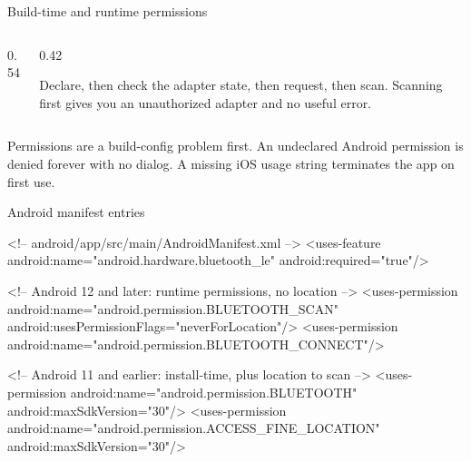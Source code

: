 \documentclass[10pt,aspectratio=169,t]{beamer}
\begin{document}
\begin{frame}[eyebrow=Permissions]{Build-time and runtime permissions}
  \vskip 2mm
  \begin{columns}[T]
    \begin{column}{0.54\textwidth}
      \vskip 2mm
    \end{column}
    \begin{column}{0.42\textwidth}
      \begin{hint}
        Declare, then check the adapter state, then request, then scan. Scanning first gives you an unauthorized adapter and no useful error.
      \end{hint}
    \end{column}
  \end{columns}
  \begin{takeaway}{Permissions are a build-config problem first.}
    An undeclared Android permission is denied forever with no dialog. A missing iOS usage string terminates the app on first use.
  \end{takeaway}
\end{frame}

\begin{frame}[fragile,eyebrow=Permissions]{Android manifest entries}
\begin{codeblock}
<!-- android/app/src/main/AndroidManifest.xml -->
<uses-feature android:name="android.hardware.bluetooth_le"
              android:required="true"/>

<!-- Android 12 and later: runtime permissions, no location -->
<uses-permission android:name="android.permission.BLUETOOTH_SCAN"
                 android:usesPermissionFlags="neverForLocation"/>
<uses-permission android:name="android.permission.BLUETOOTH_CONNECT"/>

<!-- Android 11 and earlier: install-time, plus location to scan -->
<uses-permission android:name="android.permission.BLUETOOTH"
                 android:maxSdkVersion="30"/>
<uses-permission android:name="android.permission.ACCESS_FINE_LOCATION"
                 android:maxSdkVersion="30"/>
\end{codeblock}
\end{frame}
\end{document}
